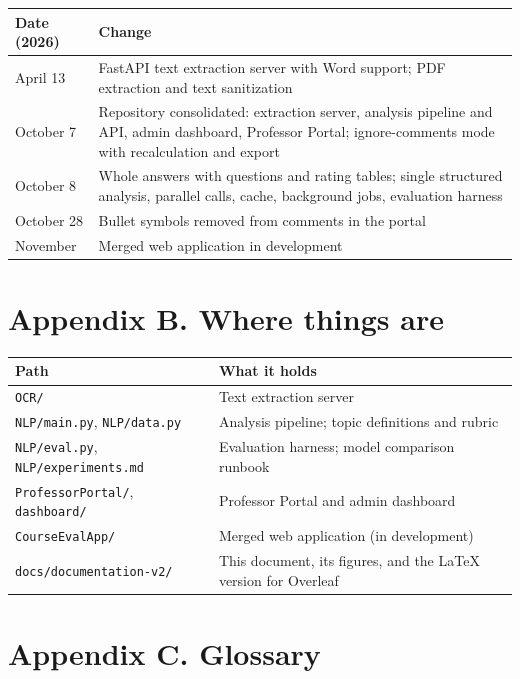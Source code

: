 \documentclass[
  11pt,
]{article}
\newcounter{none} %
\begin{document}
{\def\LTcaptype{none} %
\begin{longtable}[]{@{}ll@{}}
\toprule\noalign{}
Date (2026) & Change \\
\midrule\noalign{}
\endhead
\bottomrule\noalign{}
\endlastfoot
April 13 & FastAPI text extraction server with Word support; PDF extraction and
text sanitization \\
October 7 & Repository consolidated: extraction server, analysis pipeline and
API, admin dashboard, Professor Portal; ignore-comments mode with recalculation
and export \\
October 8 & Whole answers with questions and rating tables; single structured
analysis, parallel calls, cache, background jobs, evaluation harness \\
October 28 & Bullet symbols removed from comments in the portal \\
November & Merged web application in development \\
\end{longtable}
}

\section{Appendix B. Where things are}\label{appendix-b-where-things-are}

{\def\LTcaptype{none} %
\begin{longtable}[]{@{}ll@{}}
\toprule\noalign{}
Path & What it holds \\
\midrule\noalign{}
\endhead
\bottomrule\noalign{}
\endlastfoot
\texttt{OCR/} & Text extraction server \\
\texttt{NLP/main.py}, \texttt{NLP/data.py} & Analysis pipeline; topic
definitions and rubric \\
\texttt{NLP/eval.py}, \texttt{NLP/experiments.md} & Evaluation harness; model
comparison runbook \\
\texttt{ProfessorPortal/}, \texttt{dashboard/} & Professor Portal and admin
dashboard \\
\texttt{CourseEvalApp/} & Merged web application (in development) \\
\texttt{docs/documentation-v2/} & This document, its figures, and the LaTeX
version for Overleaf \\
\end{longtable}
}

\section{Appendix C. Glossary}\label{appendix-c-glossary}
\end{document}
